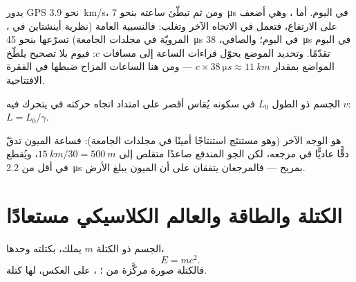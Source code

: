 \begin{remark}\label{rem:g12:special-relativity:gps}
يدور  GPS  نحو \qty{3.9}{km/s}، ومن ثم تبطّئ 
ساعته بنحو \qty{7}{\micro s} في اليوم. أما ، وهي أضعف على
الارتفاع، فتعمل في الاتجاه الآخر وتغلب: فالنسبية العامة (نظرية أينشتاين
في ، المرويّة في مجلدات الجامعة) تسرّعها بنحو
\qty{45}{\micro s} في اليوم؛ والصافي، \qty{38}{\micro s} في اليوم تقدّمًا.
وتحديد الموضع يحوّل قراءات الساعة إلى
مسافات  $c$: فيوم بلا تصحيح يلطّخ المواضع بمقدار
$c \times \qty{38}{\micro s} \approx \qty{11}{km}$ --- ومن هنا الساعات
المزاح ضبطها في الفقرة الافتتاحية.
\end{remark}

\begin{proposition}\label{prop:g12:special-relativity:contraction}
الجسم ذو الطول $L_0$ في  سكونه يُقاس أقصر على امتداد
اتجاه حركته في  يتحرك فيه  $v$:
$L = L_0/\gamma$.
\end{proposition}
\admitted

\begin{remark}\label{rem:g12:special-relativity:muonframe}
 هو الوجه الآخر  (وهو مستنتَج استنتاجًا أمينًا في
مجلدات الجامعة): فساعة الميون تدقّ دقًّا عاديًّا في مرجعه، لكن
الجو المندفع صاعدًا متقلص إلى $\qty{15}{km}/30 =
\qty{500}{m}$، ويُقطع في أقل من \qty{2.2}{\micro s} بمريح --- فالمرجعان
يتفقان على أن الميون يبلغ الأرض.
\end{remark}

\section{الكتلة والطاقة والعالم الكلاسيكي مستعادًا}

\begin{theorem}\label{thm:g12:special-relativity:emc2}
الجسم ذو الكتلة $m$ يملك، بكتلته وحدها، 
\[ E = m c^2 . \]
فالكتلة صورة مركَّزة من ؛ ، على العكس، لها كتلة.
\end{theorem}
\admitted

